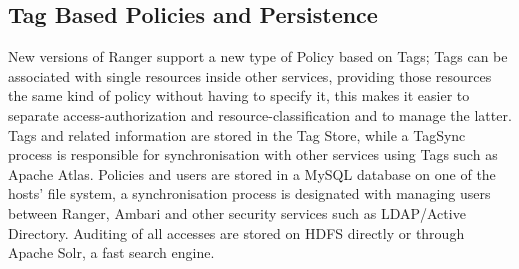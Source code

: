 \subsection{Tag Based Policies and Persistence}

New versions of Ranger support a new type of Policy based on Tags; Tags can be associated with single resources inside other services, providing those resources the same kind of policy without having to specify it, this makes it easier to separate access-authorization and resource-classification and to manage the latter.\newline
Tags and related information are stored in the Tag Store, while a TagSync process is responsible for synchronisation with other services using Tags such as Apache Atlas.
\newline
Policies and users are stored in a MySQL database on one of the hosts' file system, a synchronisation process is designated with managing users between Ranger, Ambari and other security services such as LDAP/Active Directory.\newline
Auditing of all accesses are stored on HDFS directly or through Apache Solr, a fast search engine.